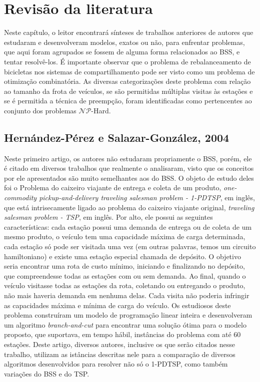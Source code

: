\chapter{Revisão da literatura}\label{chp:LABEL_CHP_2}

\par Neste capítulo, o leitor encontrará sínteses de trabalhos anteriores de autores que estudaram e desenvolveram modelos, exatos ou não, para enfrentar problemas, que aqui foram agrupados se fossem de alguma forma relacionados ao BSS, e tentar resolvê-los. É importante observar que o problema de rebalanceamento de bicicletas nos sistemas de compartilhamento pode ser visto como um problema de otimização combinatória. As diversas categorizações deste problema com relação ao tamanho da frota de veículos, se são permitidas múltiplas visitas às estações e se é permitida a técnica de preempção, foram identificadas como pertencentes ao conjunto dos problemas $\mathcal{NP}$-Hard.

\section{Hernández-Pérez e Salazar-González, 2004}\label{sec:LABEL_CHP_2_SEC_A}

Neste primeiro artigo, os autores não estudaram propriamente o BSS, porém, ele é citado em diversos trabalhos que realmente o analisaram, visto que os conceitos por ele apresentados são muito semelhantes aos do BSS. O objeto de estudo deles foi o Problema do caixeiro viajante de entrega e coleta de um produto, \textit{one-commodity pickup-and-delivery traveling salesman problem - 1-PDTSP}, em inglês, que está intrisecamente ligado ao problema do caixeiro viajante original, \textit{traveling salesman problem - TSP}, em inglês. Por alto, ele possui as seguintes características: cada estação possui uma demanda de entrega ou de coleta de um mesmo produto, o veículo tem uma capacidade máxima de carga determinada, cada estação só pode ser visitada uma vez (em outras palavras, temos um circuito hamiltoniano) e existe uma estação especial chamada de depósito. O objetivo seria encontrar uma rota de custo mínimo, iniciando e finalizando no depósito, que compreendesse todas as estações com ou sem demanda. Ao final, quando o veículo visitasse todas as estações da rota, coletando ou entregando o produto, não mais haveria demanda em nenhuma delas. Cada visita não poderia infringir as capacidades máxima e mínima de carga do veículo. Os estudiosos deste problema construíram um modelo de programação linear inteira e desenvolveram um algoritmo \textit{branch-and-cut} para encontrar uma solução ótima para o modelo proposto, que suportava, em tempo hábil, instâncias do problema com até 60 estações. Deste artigo, diversos autores, inclusive os que serão citados nesse trabalho, utilizam as istâncias descritas nele para a comparação de diversos algoritmos desenvolvidos para resolver não só o 1-PDTSP, como também variações do BSS e do TSP.

